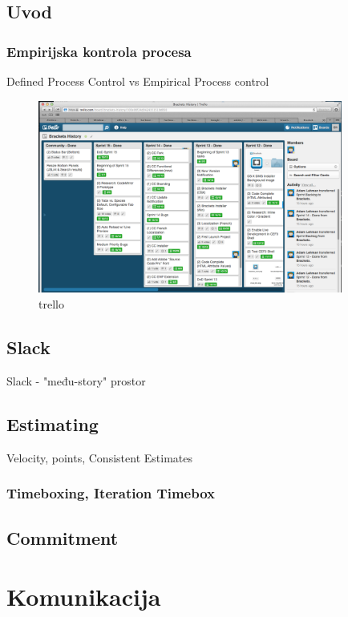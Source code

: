 \documentclass[lmodern, utf8, zavrsni]{fit}
\begin{document}
\section{Uvod}
\subsection{Empirijska kontrola procesa}

Defined Process Control vs Empirical Process control\citep{agiletransition}


\begin{figure}[H]
\centering
\includegraphics[width=10cm]{img/brackets_trello_sprint_history.png}
\caption{trello}
\end{figure}

\section{Slack}

Slack - "među-story" prostor\citep[str. 275]{agileart}

\section{Estimating}

Velocity, points,  Consistent Estimates

\subsection{Timeboxing, Iteration Timebox}

\section{Commitment}

\chapter{Komunikacija}
\end{document}
